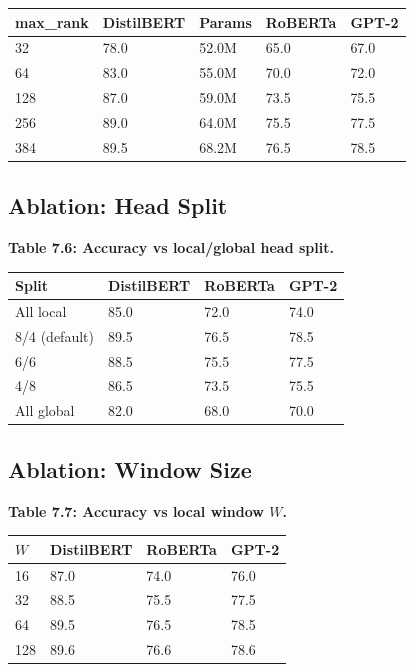 \begin{table}[H]
\centering
\small
\begin{tabular}{lllll}
\toprule
\textbf{max\_rank} & \textbf{DistilBERT} & \textbf{Params} & \textbf{RoBERTa} & \textbf{GPT-2} \\
\midrule
32 & 78.0 & 52.0M & 65.0 & 67.0 \\
64 & 83.0 & 55.0M & 70.0 & 72.0 \\
128 & 87.0 & 59.0M & 73.5 & 75.5 \\
256 & 89.0 & 64.0M & 75.5 & 77.5 \\
384 & 89.5 & 68.2M & 76.5 & 78.5 \\
\bottomrule
\end{tabular}
\end{table}

\subsection{Ablation: Head Split}

\textbf{Table 7.6: Accuracy vs local/global head split.}

\begin{table}[H]
\centering
\small
\begin{tabular}{llll}
\toprule
\textbf{Split} & \textbf{DistilBERT} & \textbf{RoBERTa} & \textbf{GPT-2} \\
\midrule
All local & 85.0 & 72.0 & 74.0 \\
8/4 (default) & 89.5 & 76.5 & 78.5 \\
6/6 & 88.5 & 75.5 & 77.5 \\
4/8 & 86.5 & 73.5 & 75.5 \\
All global & 82.0 & 68.0 & 70.0 \\
\bottomrule
\end{tabular}
\end{table}

\subsection{Ablation: Window Size}

\textbf{Table 7.7: Accuracy vs local window $W$.}

\begin{table}[H]
\centering
\small
\begin{tabular}{llll}
\toprule
\textbf{$W$} & \textbf{DistilBERT} & \textbf{RoBERTa} & \textbf{GPT-2} \\
\midrule
16 & 87.0 & 74.0 & 76.0 \\
32 & 88.5 & 75.5 & 77.5 \\
64 & 89.5 & 76.5 & 78.5 \\
128 & 89.6 & 76.6 & 78.6 \\
\bottomrule
\end{tabular}
\end{table}


